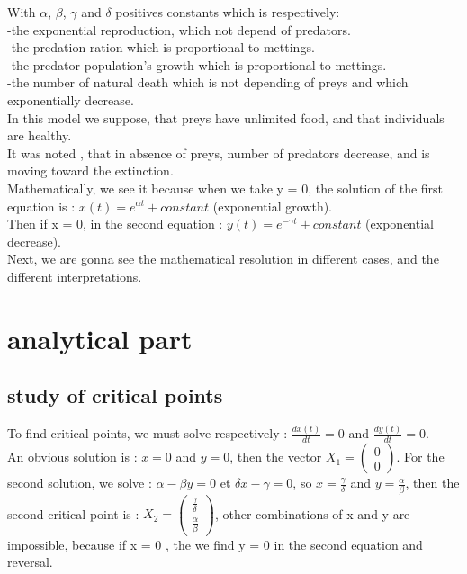 \documentclass[a4paper,16pt,twoside]{report}
\begin{document}
With $\alpha$, $\beta$, $\gamma$ and $\delta$ positives constants which is respectively:\\
    -the exponential reproduction, which not depend of predators.\\
    -the predation ration which is proportional to mettings.\\
    -the predator population's growth which is proportional to mettings.\\
    -the number of natural death which is not depending of preys and which exponentially decrease.\\
    
    
    In this model we suppose, that preys have unlimited food, and that individuals are healthy.\\
    It was noted , that in absence of preys, number of predators decrease, and is moving toward the extinction.\\
    
    
    
    Mathematically, we see it because when we take y = 0, the solution of the first equation is : $x(t)=e^{\alpha t}+constant$ (exponential growth).\\ Then if x = 0, in the second equation : $y(t)=e^{- \gamma t}+ constant$ (exponential decrease).\\
    
    
    
    Next, we are gonna see the mathematical resolution in different cases, and the different interpretations.\\
    
    \chapter{analytical part}
    
\section{study of critical points}
To find critical points, we must solve respectively : $\frac{dx(t)}{dt} = 0$ and $\frac{dy(t)}{dt} = 0$.\\
An obvious solution is : $x = 0$ and $y =0$, then the vector $X_1 = \begin{pmatrix} 0\\0 \end{pmatrix}$. For the second solution, we solve : $\alpha - \beta y = 0$ et $\delta x - \gamma = 0$, so $x = \frac{\gamma}{\delta}$ and $y = \frac{\alpha}{\beta}$, then the second critical point is : $X_2 = \begin{pmatrix} \frac{\gamma}{\delta}\\ \frac{\alpha}{\beta} \end{pmatrix}$, other combinations of x and y are impossible, because if x = 0 , the we find y = 0 in the second equation and reversal.\\
\end{document}
